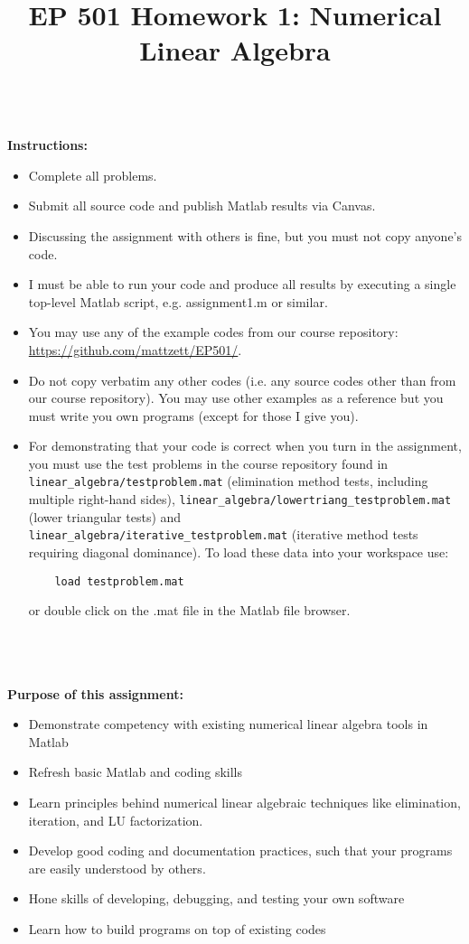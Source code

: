 \documentclass{article}
\begin{document}
\title{EP 501 Homework 1:  Numerical Linear Algebra}

\maketitle

~\\
\textbf{Instructions:}  
\begin{itemize}
  \item Complete all problems.
  \item Submit all source code and publish Matlab results via Canvas.  
  \item Discussing the assignment with others is fine, but you must not copy anyone's code.  
  \item I must be able to run your code and produce all results by executing a single top-level Matlab script, e.g. \textsf{assignment1.m} or similar.  
  \item You may use any of the example codes from our course repository:  \url{https://github.com/mattzett/EP501/}.
  \item Do not copy verbatim any other codes (i.e. any source codes other than from our course repository).  You may use other examples as a reference but you must write you own programs (except for those I give you).  
  \item For demonstrating that your code is correct when you turn in the assignment, you must use the test problems in the course repository found in \texttt{linear\_algebra/testproblem.mat} (elimination method tests, including multiple right-hand sides), \texttt{linear\_algebra/lowertriang\_testproblem.mat} (lower triangular tests) and \\ \texttt{linear\_algebra/iterative\_testproblem.mat} (iterative method tests requiring diagonal dominance).  To load these data into your workspace use:
    \begin{verbatim}
    load testproblem.mat
    \end{verbatim}
    or double click on the .mat file in the Matlab file browser.  
\end{itemize}
~\\~\\~\\
\textbf{Purpose of this assignment:}  
\begin{itemize}
  \item Demonstrate competency with existing numerical linear algebra tools in Matlab
  \item Refresh basic Matlab and coding skills
  \item Learn principles behind numerical linear algebraic techniques like elimination, iteration, and LU factorization.  
  \item Develop good coding and documentation practices, such that your programs are easily understood by others.  
  \item Hone skills of developing, debugging, and testing your own software
  \item Learn how to build programs on top of existing codes
\end{itemize}
\end{document}
